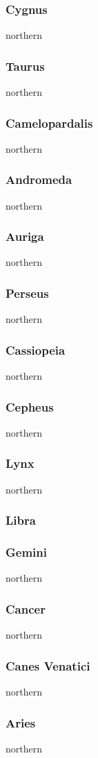 \subsubsection{Cygnus}
northern
\subsubsection{Taurus}
northern
\subsubsection{Camelopardalis}
northern
\subsubsection{Andromeda}
northern
\subsubsection{Auriga}
northern
\subsubsection{Perseus}
northern
\subsubsection{Cassiopeia}
northern
\subsubsection{Cepheus}
northern
\subsubsection{Lynx}
northern
\subsubsection{Libra}
\subsubsection{Gemini}
northern
\subsubsection{Cancer}
northern
\subsubsection{Canes Venatici}
northern
\subsubsection{Aries}
northern
